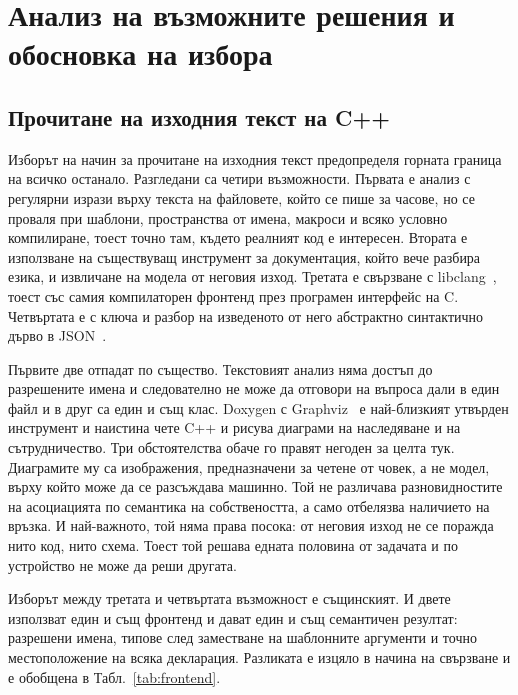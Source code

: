 \section{Анализ на възможните решения и обосновка на избора}
\label{sec:alternatives}

\subsection{Прочитане на изходния текст на C++}

Изборът на начин за прочитане на изходния текст предопределя горната граница на всичко
останало. Разгледани са четири възможности. Първата е анализ с регулярни изрази върху
текста на файловете, който се пише за часове, но се проваля при шаблони, пространства
от имена, макроси и всяко условно компилиране, тоест точно там, където реалният код е
интересен. Втората е използване на съществуващ инструмент за документация, който вече
разбира езика, и извличане на модела от неговия изход. Третата е свързване с
libclang~\cite{libclang_docs}, тоест със самия компилаторен фронтенд през програмен
интерфейс на C. Четвъртата е  с
ключа  и разбор на изведеното от него абстрактно
синтактично дърво в JSON~\cite{clang_ast_json,rfc8259}.

Първите две отпадат по същество. Текстовият анализ няма достъп до разрешените имена и
следователно не може да отговори на въпроса дали  в един файл и
 в друг са един и същ клас. Doxygen с Graphviz~\cite{doxygen_manual,%
ellson2001graphviz} е най-близкият утвърден инструмент и наистина чете C++ и рисува
диаграми на наследяване и на сътрудничество. Три обстоятелства обаче го правят негоден
за целта тук. Диаграмите му са изображения, предназначени за четене от човек, а не
модел, върху който може да се разсъждава машинно. Той не различава разновидностите на
асоциацията по семантика на собствеността, а само отбелязва наличието на връзка. И
най-важното, той няма права посока: от неговия изход не се поражда нито код, нито схема.
Тоест той решава едната половина от задачата и по устройство не може да реши другата.

Изборът между третата и четвъртата възможност е същинският. И двете използват един и
същ фронтенд и дават един и същ семантичен резултат: разрешени имена, типове след
заместване на шаблонните аргументи и точно местоположение на всяка декларация. Разликата
е изцяло в начина на свързване и е обобщена в Табл.~\ref{tab:frontend}.


